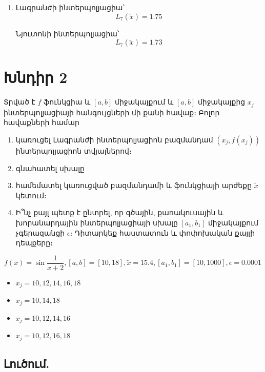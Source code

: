 \documentclass{article}
\begin{document}
\begin{enumerate}
\item

	Լագրանժի ինտերպոլյացիա՝\\
			$$L_{7}\left(\tilde{x}\right) = 1.75$$

	Նյուտոնի ինտերպոլյացիա՝\\
			$$L_{7}\left(\tilde{x}\right) = 1.73$$
\end{enumerate}
\newpage

\section*{Խնդիր 2}

Տրված է $f$ ֆունկցիա և $\left[a, b\right]$ միջակայքում և $\left[a, b\right]$ միջակայքից $x_{j}$ ինտերպոլյացիայի հանգույցների մի քանի հավաք։ Բոլոր հավաքների համար

\begin{enumerate}

\item 
կառուցել Լագրանժի ինտերպոլյացիոն բազմանդամ $\left(x_{j}, f\left(x_{j}\right)\right)$ ինտերպոլյացիոն տվյալներով։
\item
գնահատել սխալը
\item
համեմատել կառուցված բազմանդամի և ֆունկցիայի արժեքը $\tilde{x}$ կետում։
\item
Ի՞նչ քայլ պետք է ընտրել, որ գծային, քառակուսային և խորանարդային ինտերպոլյացիայի սխալը $\left[a_{1}, b_{1}\right]$ միջակայքում չգերազանցի $\epsilon$։ Դիտարկեք հաստատուն և փոփոխական քայլի դեպքերը։

\end{enumerate}


$$
	f\left(x\right) = \sin\frac{1}{x + 2}, \left[a, b\right] = \left[10, 18\right], \tilde{x} = 15.4, \left[a_{1}, b_{1}\right] = \left[10, 1000\right], \epsilon = 0.0001
$$


\begin{itemize}  
\item $x_{j} = 10, 12, 14, 16, 18$
\item $x_{j} = 10, 14, 18$
\item $x_{j} = 10, 12, 14, 16$
\item $x_{j} = 10, 12, 16, 18$
\end{itemize}  




\subsection*{Լուծում.}
\end{document}
